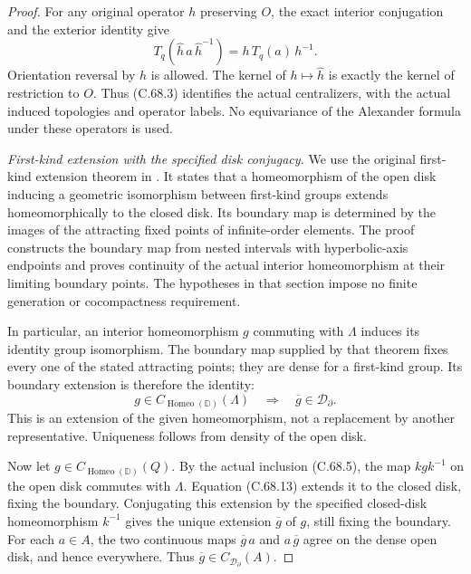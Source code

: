 \begin{proof}
For any original operator $h$ preserving $O$,
the exact interior conjugation and the exterior
identity give
\[
          T_q(\widehat h\,a\,\widehat h^{-1})
                        =h\,T_q(a)\,h^{-1}.
                                                               \tag{C.68.12}
\]
Orientation reversal by $h$ is allowed.
The kernel of $h\mapsto\widehat h$ is exactly
the kernel of restriction to $O$.
Thus (C.68.3) identifies the actual centralizers,
with the actual induced topologies and operator
labels. No equivariance of the Alexander formula
under these operators is used.

\emph{First-kind extension with the specified disk conjugacy.}
We use the original first-kind extension theorem
in \cite[Section~3.B, Proposition~3.5 and
Corollary~3.5.1, pp.~31--32]{C_Tukia1972}.
It states that a homeomorphism of the open disk
inducing a geometric isomorphism between
first-kind groups extends homeomorphically to
the closed disk. Its boundary map is determined
by the images of the attracting fixed points
of infinite-order elements. The proof constructs
the boundary map from nested intervals with
hyperbolic-axis endpoints and proves continuity
of the actual interior homeomorphism at their
limiting boundary points. The hypotheses in
that section impose no finite generation or
cocompactness requirement.

In particular, an interior homeomorphism $g$
commuting with $\Lambda$ induces its identity
group isomorphism. The boundary map supplied
by that theorem fixes every one of the stated
attracting points; they are dense for a
first-kind group. Its boundary extension is
therefore the identity:
\[
      g\in C_{\operatorname{Homeo}(\mathbb D)}(\Lambda)
        \quad\Longrightarrow\quad
      \overline g\in\mathcal D_\partial .
                                                               \tag{C.68.13}
\]
This is an extension of the given homeomorphism,
not a replacement by another representative.
Uniqueness follows from density of the open disk.

Now let $g\in C_{\operatorname{Homeo}(\mathbb D)}(Q)$.
By the actual inclusion (C.68.5), the map
$k g k^{-1}$ on the open disk commutes with
$\Lambda$. Equation (C.68.13) extends it to
the closed disk, fixing the boundary.
Conjugating this extension by the specified
closed-disk homeomorphism $k^{-1}$ gives the
unique extension $\overline g$ of $g$, still
fixing the boundary. For each $a\in A$,
the two continuous maps $\overline g\,a$
and $a\,\overline g$ agree on the dense open
disk, and hence everywhere.
Thus $\overline g\in C_{\mathcal D_\partial}(A)$.


\end{proof}
